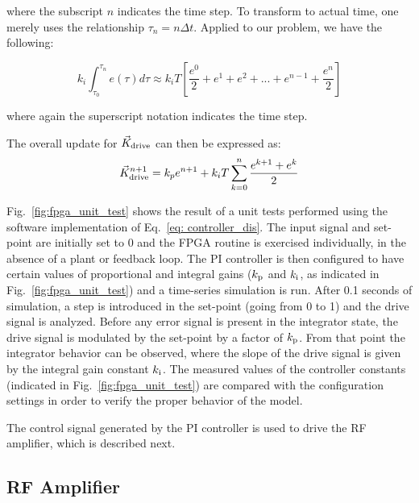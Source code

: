 \documentclass[a4paper,12pt]{article}
\newcommand{\be}{\begin{equation}}
\newcommand{\ee}{\end{equation}}
\begin{document}
\noindent where the subscript $n$ indicates the time step. To transform to actual time, one merely uses the relationship $\tau_{n} = n\Delta t$. Applied to our problem, we have the following:

\be
k_{i} \int_{\tau_{0}}^{\tau_{n}} e(\tau)d\tau \approx k_{i}T
	      \left[\frac{e^{0}}{2} + e^{1} + e^{2} + ...
		+ e^{n-1} + \frac{e^{n}}{2} \right]
\ee

\noindent where again the superscript notation indicates the time step.

The overall update for $\vec{K}_{\rm drive}$ can then be expressed as:
\be \label{eq: controller_dis}
\vec{K}_{\rm drive}^{n+1} = k_{p} e^{n+1} + k_{i}T \sum_{k=0}^{n}\frac{e^{k+1}+e^k}{2}
\ee

Fig.~\ref{fig:fpga_unit_test} shows the result of a unit tests performed using the software implementation of Eq.~\ref{eq: controller_dis}. The input signal and set-point are initially set to 0 and the FPGA routine is exercised individually, in the absence of a plant or feedback loop. The PI controller is then configured to have certain values of proportional and integral gains ($k_{\rm p}$ and $k_{\rm i}$, as indicated in Fig.~\ref{fig:fpga_unit_test}) and a time-series simulation is run. After 0.1 seconds of simulation, a step is introduced in the set-point (going from 0 to 1) and the drive signal is analyzed. Before any error signal is present in the integrator state, the drive signal is modulated by the set-point by a factor of $k_{\rm p}$. From that point the integrator behavior can be observed, where the slope of the drive signal is given by the integral gain constant $k_{\rm i}$. The measured values of the controller constants (indicated in Fig.~\ref{fig:fpga_unit_test}) are compared with the configuration settings in order to verify the proper behavior of the model.

The control signal generated by the PI controller is used to drive the RF amplifier, which is described next.

\subsection{RF Amplifier}
\end{document}
